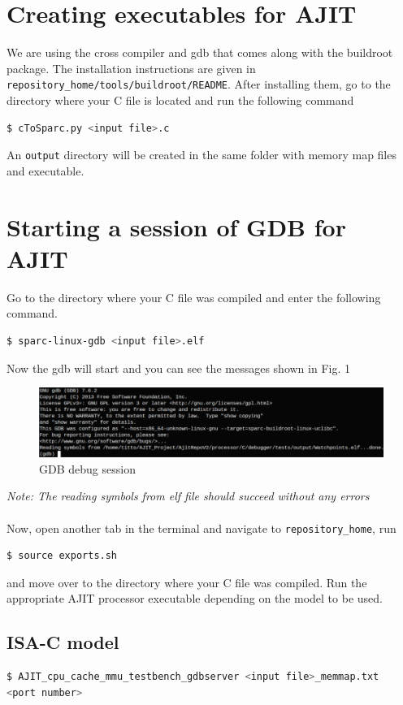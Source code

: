 \documentclass[a4paper, 11pt]{article}
\begin{document}
\section{Creating executables for AJIT}
We are using the cross compiler and gdb that comes along with the buildroot package. The installation instructions are given in \texttt{repository\_home/tools/buildroot/README}. After installing them, go to the directory where your C file is located and run the following command
\begin{lstlisting}[language=bash]
$ cToSparc.py <input file>.c
\end{lstlisting}
An \texttt{output} directory will be created in the same folder with memory map files and executable.

\section{Starting a session of GDB for AJIT}
Go to the directory where your C file was compiled and enter the following command.
\begin{lstlisting}[language=bash]
$ sparc-linux-gdb <input file>.elf
\end{lstlisting}
Now the gdb will start and you can see the messages shown in Fig. 1

\begin{figure}[H]
		\centering
		\includegraphics[width=0.8\columnwidth]{Figs/first.png}
		\caption{GDB debug session}
\end{figure}

\textit{Note: The reading symbols from elf file should succeed without any errors}
\\\\
Now, open another tab in the terminal and navigate to \texttt{repository\_home}, run 
\begin{lstlisting}[language=bash]
$ source exports.sh
\end{lstlisting}

and move over to the directory where your C file was compiled. Run the appropriate AJIT processor executable depending on the model to be used.

\subsection*{ISA-C model}
\begin{lstlisting}[language=bash]
$ AJIT_cpu_cache_mmu_testbench_gdbserver <input file>_memmap.txt
<port number>
\end{lstlisting}
\end{document}
